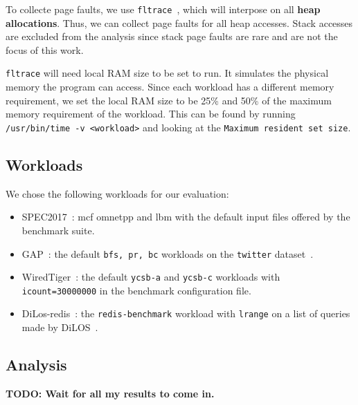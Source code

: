 To collecte page faults, we use \texttt{fltrace}~\cite{fltrace}, which will interpose on all \textbf{heap allocations}. Thus, we can collect page faults for all heap accesses. Stack accesses are excluded from the analysis since stack page faults are rare and are not the focus of this work.

\texttt{fltrace} will need local RAM size to be set to run. It simulates the physical memory the program can access. Since each workload has a different memory requirement, we set the local RAM size to be 25\% and 50\% of the maximum memory requirement of the workload. This can be found by running \texttt{/usr/bin/time -v <workload>} and looking at the \texttt{Maximum resident set size}.

\subsection{Workloads}

We chose the following workloads for our evaluation:\begin{itemize}
    \item SPEC2017~\cite{SPEC2017}: mcf omnetpp and lbm with the default input files offered by the benchmark suite.
    \item GAP~\cite{gapbs}: the default \texttt{bfs, pr, bc} workloads on the \texttt{twitter} dataset~\cite{twitter-dataset}.
    \item WiredTiger~\cite{wiredtiger}: the default \texttt{ycsb-a} and \texttt{ycsb-c} workloads with \texttt{icount=30000000} in the benchmark configuration file.
    \item DiLos-redis~\cite{redis, dilos}: the \texttt{redis-benchmark} workload with \texttt{lrange} on a list of queries made by DiLOS~\cite{dilos}.
\end{itemize}

\subsection{Analysis}

\textbf{TODO: Wait for all my results to come in.}


